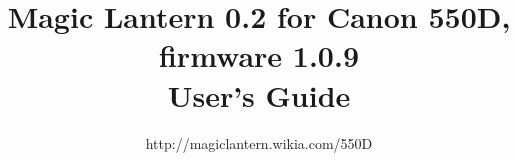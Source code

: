 \documentclass{article}
\begin{document}
\title{Magic Lantern 0.2 for Canon 550D, firmware 1.0.9\\User's Guide}
\author{http://magiclantern.wikia.com/550D}
\maketitle
\tableofcontents
\newpage
\let\subsubsection=\subsection
\let\subsection=\section
\def\section#1{}

\end{document}
